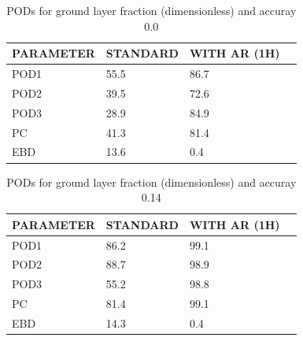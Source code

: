 \documentclass[11pt,english]{article}
\begin{document}
\begin{table}[]
\begin{center}
\begin{tabular}{|l|l|l|l|}
\hline
\multicolumn{1}{|c|}{\cellcolor[HTML]{C0C0C0}\textbf{PARAMETER}} & \multicolumn{1}{c|}{\cellcolor[HTML]{C0C0C0}\textbf{STANDARD}} & \multicolumn{1}{c|}{\cellcolor[HTML]{C0C0C0}\textbf{WITH AR (1H)}} \\
\hline
\cellcolor[HTML]{C0C0C0}POD1  & 55.5                                & 86.7         \\
\cellcolor[HTML]{C0C0C0}POD2  & 39.5                                & 72.6         \\
\cellcolor[HTML]{C0C0C0}POD3  & 28.9                                & 84.9         \\
\cellcolor[HTML]{C0C0C0}PC    & 41.3                                  & 81.4           \\
\cellcolor[HTML]{C0C0C0}EBD   & 13.6                                 & 0.4          \\
\hline
\end{tabular}
\caption{PODs for ground layer fraction (dimensionless) and accuray 0.0}
\end{center}
\end{table}
\begin{table}[]
\begin{center}
\begin{tabular}{|l|l|l|l|}
\hline
\multicolumn{1}{|c|}{\cellcolor[HTML]{C0C0C0}\textbf{PARAMETER}} & \multicolumn{1}{c|}{\cellcolor[HTML]{C0C0C0}\textbf{STANDARD}} & \multicolumn{1}{c|}{\cellcolor[HTML]{C0C0C0}\textbf{WITH AR (1H)}} \\
\hline
\cellcolor[HTML]{C0C0C0}POD1  & 86.2                                & 99.1         \\
\cellcolor[HTML]{C0C0C0}POD2  & 88.7                                & 98.9         \\
\cellcolor[HTML]{C0C0C0}POD3  & 55.2                                & 98.8         \\
\cellcolor[HTML]{C0C0C0}PC    & 81.4                                  & 99.1           \\
\cellcolor[HTML]{C0C0C0}EBD   & 14.3                                 & 0.4          \\
\hline
\end{tabular}
\caption{PODs for ground layer fraction (dimensionless) and accuray 0.14}
\end{center}
\end{table}
\clearpage
\end{document}
